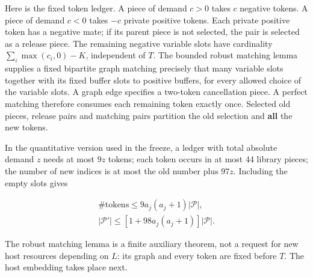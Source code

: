 \documentclass[english,11pt,a4paper]{article}
\begin{document}
Here is the fixed token ledger. A piece of demand \(c>0\) takes \(c\) negative tokens. A piece of demand \(c<0\) takes \(-c\) private positive tokens. Each private positive token has a negative mate; if its parent piece is not selected, the pair is selected as a release piece. The remaining negative variable slots have cardinality \(\sum_i\max(c_i,0)-K\), independent of \(T\). The bounded robust matching lemma supplies a fixed bipartite graph matching precisely that many variable slots together with its fixed buffer slots to positive buffers, for every allowed choice of the variable slots. A graph edge specifies a two-token cancellation piece. A perfect matching therefore consumes each remaining token exactly once. Selected old pieces, release pairs and matching pairs partition the old selection and \textbf{all} the new tokens.

In the quantitative version used in the freeze, a ledger with total absolute demand \(z\) needs at most \(9z\) tokens; each token occurs in at most 44 library pieces; the number of new indices is at most the old number plus \(97z\). Including the empty slots gives

\[\begin{gathered}
\#\text{tokens}\le9a_j(a_j+1)|\mathcal P|,\\
|\mathcal P'|\le[1+98a_j(a_j+1)]|\mathcal P|.
\end{gathered}
\tag{B.4.4}\]

The robust matching lemma is a finite auxiliary theorem, not a request for new host resources depending on \(L\): its graph and every token are fixed before \(T\). The host embedding takes place next.
\end{document}
